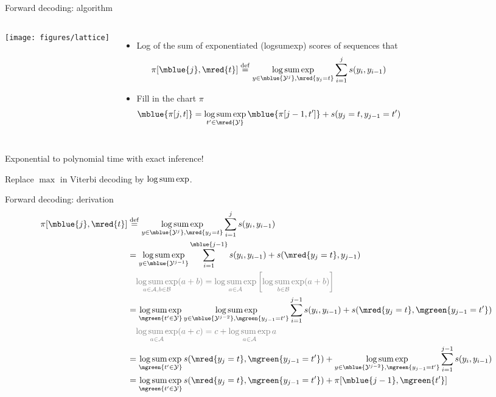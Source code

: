 \documentclass[usenames,dvipsnames,notes,11pt,aspectratio=169]{beamer}
\begin{document}
\begin{frame}
    {Forward decoding: algorithm}
    \begin{columns}
        \texttt{[image: figures/lattice]}
        \begin{itemize}
            \item Log of the sum of exponentiated (logsumexp) scores of  sequences that 
                $$
                \pi[\mblue{j}, \mred{t}] \eqdef \logsumexp_{y\in\mblue{\sY^j}, \mred{y_j=t}}\sum_{i=1}^j s(y_i, y_{i-1}) 
                $$
            \item Fill in the chart $\pi$ 
                $$
                \mblue{\pi[j, t]} = \logsumexp_{t'\in\mred{\sY}} \mblue{\pi[j-1, t']} + s(y_j=t, y_{j-1}=t')
                $$
        \end{itemize}
    \end{columns}

    Exponential to polynomial time with exact inference!

    Replace $\max$ in Viterbi decoding by $\operatorname*{log\,sum\,exp}$.

\end{frame}

\begin{frame}
    {Forward decoding: derivation}
    \vspace{-2em}
    \begin{align*}
        \pi[\mblue{j}, \mred{t}] &\eqdef \logsumexp_{y\in\mblue{\sY^j}, \mred{y_j=t}} \sum_{i=1}^j s(y_i, y_{i-1}) \\
        &= \logsumexp_{y\in\mblue{\sY^{j-1}}} \sum_{i=1}^{\mblue{j-1}} s(y_i, y_{i-1}) + s(\mred{y_j=t}, y_{j-1}) \\
        & \quad \color{gray}{
                \logsumexp_{a\in\sA, b\in\sB}(a+b)
                = \logsumexp_{a\in\sA}\pb{\logsumexp_{b\in\sB}(a+b)}
        }\\
        &= \logsumexp_{\mgreen{t'\in\sY}}\logsumexp_{y\in\mblue{\sY^{j-2}}, \mgreen{y_{j-1}=t'}} \sum_{i=1}^{j-1} s(y_i, y_{i-1}) + s(\mred{y_j=t}, \mgreen{y_{j-1}=t'}) \\
        & \quad \color{gray}{
            \logsumexp_{a\in\sA} (a + c) = c + \logsumexp_{a\in\sA} a
        }\\
        &= \logsumexp_{\mgreen{t'\in\sY}} s(\mred{y_j=t}, \mgreen{y_{j-1}=t'}) + 
        \logsumexp_{y\in\mblue{\sY^{j-2}}, \mgreen{y_{j-1}=t'}} \sum_{i=1}^{j-1} s(y_i, y_{i-1}) \\
        &= \logsumexp_{\mgreen{t'\in\sY}} s(\mred{y_j=t}, \mgreen{y_{j-1}=t'}) + \pi[\mblue{j-1}, \mgreen{t'}]
    \end{align*}

\end{frame}
\end{document}
